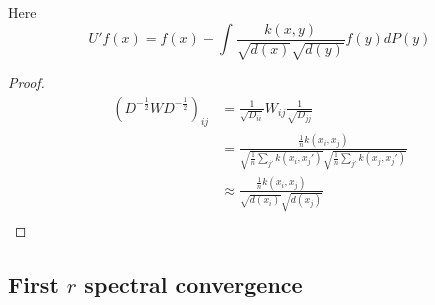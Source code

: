 \documentclass[12pt]{article}
\theoremstyle{plain}
\begin{document}
Here
\[
U' f(x) = f(x) - \int{ \frac{ k(x, y) }{ \sqrt{ d(x) } \sqrt{ d(y) } } f(y) dP(y) }
\]

\begin{proof}

  \begin{align*}
    (D^{-\frac{1}{2}} W D^{-\frac{1}{2}})_{ij} &= \frac{1}{\sqrt{D_{ii}}} W_{ij} \frac{1}{\sqrt{D_{jj}}} \\
    &= \frac{ \frac{1}{n} k(x_i, x_j) }{ \sqrt{ \frac{1}{n} \sum_{j'} k(x_i, x_j') } \sqrt{ \frac{1}{n} \sum_{j'} k(x_j, x_j') } } \\
    &\approx \frac{ \frac{1}{n} k(x_i, x_j) }{ \sqrt{d(x_i)} \sqrt{d(x_j)} } \\
  \end{align*}

\end{proof}

\subsection{First $ r $ spectral convergence}
\end{document}
